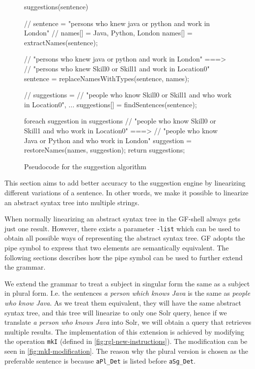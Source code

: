 \begin{figure}[H]
\begin{java-code}
suggestions(sentence) {
    // sentence = "persons who knew java or python and work in London"
    // names[] = {Java, Python, London}
    names[] = extractNames(sentence);
    
    // "persons who knew java or python and work in London" ===> 
    // "persons who knew Skill0 or Skill1 and work in Location0"
    sentence = replaceNamesWithTypes(sentence, names);
    
    // suggestions =
    //   { "people who know Skill0 or Skill1 and who work in Location0", ... }
    suggestions[] = findSentences(sentence);
    
    foreach suggestion in suggestions {
        // "people who know Skill0 or Skill1 and who work in Location0" ===> 
        // "people who know Java or Python and who work in London"
        suggestion = restoreNames(names, suggestion);
    } 
    return suggestions; 
}
\end{java-code}
\caption{Pseudocode for the suggestion algorithm\label{fig:psuedocode-suggestions}}
\end{figure}

This section aims to add better accuracy to the suggestion engine by linearizing different variations of a sentence. In other words, we make it possible to linearize an abstract syntax tree into multiple strings. 

When normally linearizing an abstract syntax tree in the GF-shell always gets just one result. However, there exists a parameter \texttt{-list} which can be used to obtain all possible ways of representing the abstract syntax tree.
\newline
\newline
GF adopts the pipe symbol to express that two elements are semantically equivalent. The following sections describes how the pipe symbol can be used to further extend the grammar.

We extend the grammar to treat a subject in singular form the same as a subject in plural form. I.e. the sentences \emph{a person which knows Java} is the same as \emph{people who know Java}. As we treat them equivalent, they will have the same abstract syntax tree, and this tree will linearize to only one Solr query, hence if we translate \emph{a person who knows Java} into Solr, we will obtain a query that retrieves multiple results. The implementation of this extension is achieved by modifying the operation \texttt{mkI} (defined in \autoref{fig:rgl-new-instructions}). The modification can be seen in \autoref{fig:mkI-modification}. The reason why the plural version is chosen as the preferable sentence is because \texttt{aPl\_Det} is listed before \texttt{aSg\_Det}.

